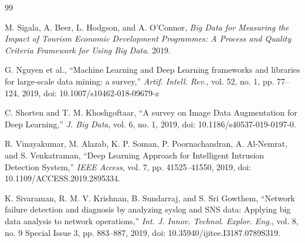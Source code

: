 \documentclass{telkomnika}
\begin{document}



%


\begin{thebibliography} {99} 
\footnotesize
\itemsep 0pt 




  M. Sigala, A. Beer, L. Hodgson, and A. O’Connor, \emph{Big Data for Measuring the Impact of Tourism Economic Development Programmes: A Process and Quality Criteria Framework for Using Big Data}. 2019.

 G. Nguyen et al., “Machine Learning and Deep Learning frameworks and libraries for large-scale data mining: a survey,” \textsl{Artif. Intell. Rev.}, vol. 52, no. 1, pp. 77–124, 2019, doi: 10.1007/s10462-018-09679-z

 C. Shorten and T. M. Khoshgoftaar, “A survey on Image Data Augmentation for Deep Learning,” \textsl{J. Big Data}, vol. 6, no. 1, 2019, doi: 10.1186/s40537-019-0197-0.

 R. Vinayakumar, M. Alazab, K. P. Soman, P. Poornachandran, A. Al-Nemrat, and S. Venkatraman, “Deep Learning Approach for Intelligent Intrusion Detection System,” \textsl{IEEE Access}, vol. 7, pp. 41525–41550, 2019, doi: 10.1109/ACCESS.2019.2895334.

 K. Sivaraman, R. M. V. Krishnan, B. Sundarraj, and S. Sri Gowthem, “Network failure detection and diagnosis by analyzing syslog and SNS data: Applying big data analysis to network operations,” \textsl{Int. J. Innov. Technol. Explor. Eng.}, vol. 8, no. 9 Special Issue 3, pp. 883–887, 2019, doi: 10.35940/ijitee.I3187.0789S319.


\end{thebibliography}
\end{document}
